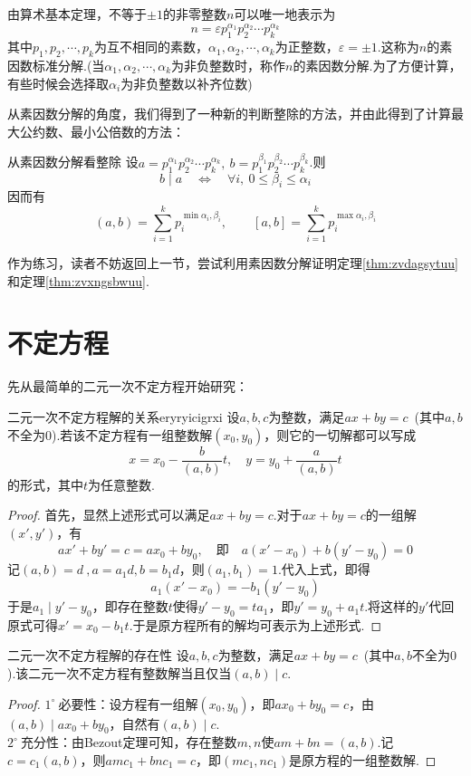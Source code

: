 \documentclass[lang=cn, zihao=5]{elegantbook}
\newcommand{\buzhou}[1]{$#1^{\circ} \ $}
\begin{document}
由算术基本定理，不等于$\pm 1$的非零整数$n$可以唯一地表示为$$n = \varepsilon p_1^{\alpha _1} p_2^{\alpha _2} \cdots p_k^{\alpha _k}$$
其中$p_1,p_2, \cdots ,p_k$为互不相同的素数，$\alpha _1 ,\alpha _2,\cdots ,\alpha _k$为正整数，$\varepsilon =\pm 1$.这称为$n$的素因数标准分解.(当$\alpha _1 ,\alpha _2,\cdots ,\alpha _k$为非负整数时，称作$n$的素因数分解.为了方便计算，有些时候会选择取$\alpha _i$为非负整数以补齐位数)

从素因数分解的角度，我们得到了一种新的判断整除的方法，并由此得到了计算最大公约数、最小公倍数的方法：

\begin{proposition}{从素因数分解看整除}
	设$a=p_1^{\alpha _1} p_2^{\alpha _2} \cdots p_k^{\alpha _k},~b=p_1^{\beta _1} p_2^{\beta _2} \cdots p_k^{\beta _k}$.则
	$$b \mid a \quad \Longleftrightarrow \quad \forall i,~0 \leq \beta _i \leq \alpha _i$$
	因而有
	$$(a,b)=\sum_{i=1}^{k} p_i^{\min {\alpha _i,\beta _i}}, \quad \quad [a,b]=\sum_{i=1}^{k} p_i^{\max {\alpha _i,\beta _i}}$$
\end{proposition}

作为练习，读者不妨返回上一节，尝试利用素因数分解证明定理\ref{thm:zvdagsytuu}和定理\ref{thm:zvxngsbwuu}.

\section{不定方程}

先从最简单的二元一次不定方程开始研究：

\begin{theorem}{二元一次不定方程解的关系}{eryryicigrxi}
	设$a,b,c$为整数，满足$ax+by=c$~(其中$a,b$不全为$0$).若该不定方程有一组整数解$(x_0,y_0)$，则它的一切解都可以写成$$x=x_0-\frac{b}{(a,b)}t,\quad y=y_0+\frac{a}{(a,b)}t$$
	的形式，其中$t$为任意整数.
\end{theorem}
\begin{proof}
	首先，显然上述形式可以满足$ax+by=c$.对于$ax+by=c$的一组解$(x',y')$，有$$ax'+by' = c = ax_0+by_0,\quad \textit{即} \quad a(x'-x_0) + b(y'-y_0) = 0$$
	记$(a,b)=d~,a=a_1d,b=b_1d$，则$(a_1,b_1)=1$.代入上式，即得$$a_1(x'-x_0)=-b_1(y'-y_0)$$
	于是$a_1 \mid y'-y_0$，即存在整数$t$使得$y'-y_0=ta_1$，即$y'=y_0+a_1t$.将这样的$y'$代回原式可得$x'=x_0-b_1t$.于是原方程所有的解均可表示为上述形式.
\end{proof}

\begin{theorem}{二元一次不定方程解的存在性}
	设$a,b,c$为整数，满足$ax+by=c$~(其中$a,b$不全为$0$).该二元一次不定方程有整数解当且仅当$(a,b) \mid c$.
\end{theorem}
\begin{proof}
	\buzhou{1}必要性：设方程有一组解$(x_0,y_0)$，即$ax_0+by_0=c$，由$(a,b) \mid ax_0+by_0$，自然有$(a,b) \mid c$. \\
	\buzhou{2}充分性：由Bezout定理可知，存在整数$m,n$使$am+bn=(a,b)$.记$c=c_1(a,b)$，则$amc_1+bnc_1=c$，即$(mc_1,nc_1)$是原方程的一组整数解.
\end{proof}
\end{document}
